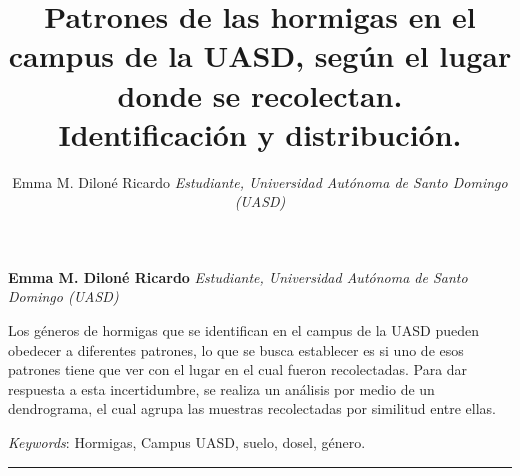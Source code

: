 \documentclass[11pt,]{article}
\title{Patrones de las hormigas en el campus de la UASD, según el lugar donde
se recolectan.\\
Identificación y distribución.  }
\author{\Large Emma M. Diloné Ricardo\vspace{0.05in} \newline\normalsize\emph{Estudiante, Universidad Autónoma de Santo Domingo (UASD)}  }
\date{}
\newcommand*{\authorfont}{\fontfamily{phv}\selectfont}
\renewenvironment{abstract}
 {{%
    \setlength{\leftmargin}{0mm}
    \setlength{\rightmargin}{\leftmargin}%
  }%
  \relax}
 {\endlist}
\begin{document}
	
%

{%
\setlength{\parindent}{0pt}
\thispagestyle{plain}
{\fontsize{18}{20}\selectfont\raggedright 
\maketitle  %

}

{
   \vskip 13.5pt\relax \normalsize\fontsize{11}{12} 
\textbf{\authorfont Emma M. Diloné Ricardo} \hskip 15pt \emph{\small Estudiante, Universidad Autónoma de Santo Domingo (UASD)}   

}

}








\begin{abstract}

    \hbox{\vrule height .2pt width 39.14pc}

    \vskip 8.5pt %

\noindent Los géneros de hormigas que se identifican en el campus de la UASD
pueden obedecer a diferentes patrones, lo que se busca establecer es si
uno de esos patrones tiene que ver con el lugar en el cual fueron
recolectadas. Para dar respuesta a esta incertidumbre, se realiza un
análisis por medio de un dendrograma, el cual agrupa las muestras
recolectadas por similitud entre ellas.


\vskip 8.5pt \noindent \emph{Keywords}: Hormigas, Campus UASD, suelo, dosel, género. \par

    \hbox{\vrule height .2pt width 39.14pc}



\end{abstract}


\vskip 6.5pt


\noindent  \begin{center}\rule{0.5\linewidth}{\linethickness}\end{center}
\end{document}
